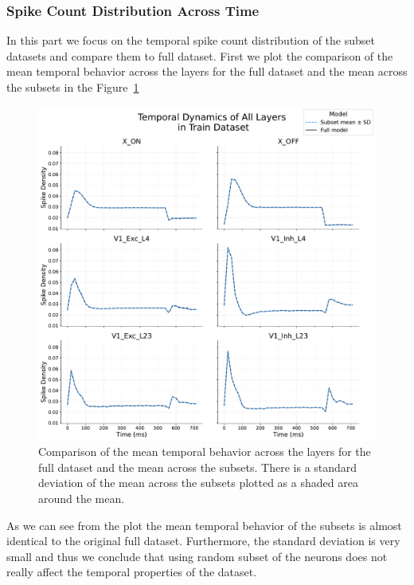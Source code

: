 \subsubsection{Spike Count Distribution Across Time}
\label{subsubsec:spike_time_distribution_subset}
In this part we focus on the temporal spike count distribution of the subset datasets and compare them to full dataset. First we plot the comparison of the mean temporal behavior across the layers for the full dataset and the mean across the subsets in the Figure~\ref{fig:temporal_distribution_subset_vs_full_train}

\begin{figure}
    \centering
    \includegraphics[width=\linewidth]{img/plots/temporal_distribution_subset_vs_full_train.pdf}
    \caption{Comparison of the mean temporal behavior across the layers for the full dataset and the mean across the subsets. There is a standard deviation of the mean across the subsets plotted as a shaded area around the mean.}
    \label{fig:temporal_distribution_subset_vs_full_train}
\end{figure}

As we can see from the plot the mean temporal behavior of the subsets is almost identical to the original full dataset. Furthermore, the standard deviation is very small and thus we conclude that using random subset of the neurons does not really affect the temporal properties of the dataset.

